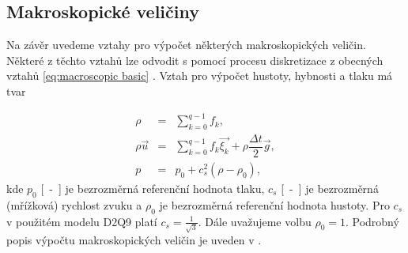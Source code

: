\subsection{Makroskopické veličiny}\label{macro}
Na závěr uvedeme vztahy pro výpočet některých makroskopických veličin. Některé z těchto vztahů lze odvodit s pomocí procesu diskretizace z obecných vztahů \ref{eq:macroscopic basic} \cite{Kruger}. Vztah pro výpočet hustoty, hybnosti a tlaku má tvar

\begin{subequations}\label{macroeq}
	\begin{eqnarray}
	\label{rho}
	\rho &=& \sum_{k=0}^{q-1} f_{k},\\[3pt]
	\rho \vec{u} &=& \sum_{k=0}^{q-1} f_{k} \vec{\xi_{k}} + \rho \dfrac{\Delta t}{2} \vec{g},\\[3pt]
	p &=& p_0 + c_{s}^{2} (\rho - \rho_0),
	\end{eqnarray}
\end{subequations}
kde $ p_0 $ \si{[-]} je bezrozměrná referenční hodnota tlaku, $ c_s $ \si{[-]} je bezrozměrná (mřížková) rychlost zvuku a $ \rho_0 $ je bezrozměrná referenční hodnota hustoty. Pro $ c_s $ v použitém modelu D2Q9 platí $ c_s = \frac{1}{\sqrt{3}} $. Dále uvažujeme volbu $ \rho_0 = 1 $. Podrobný popis výpočtu makroskopických veličin je uveden v \cite{Kruger}.

